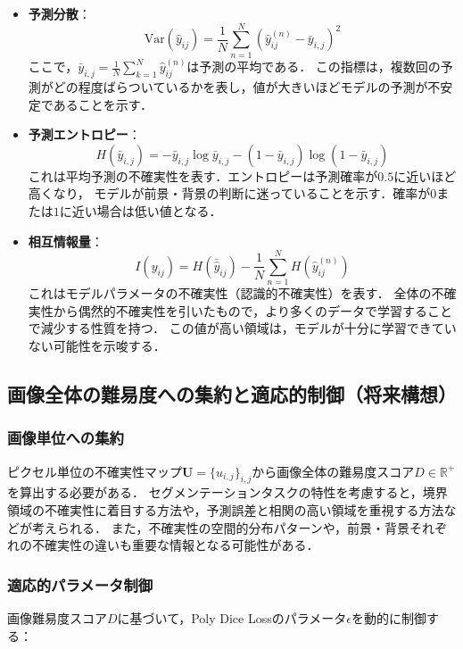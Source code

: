 \documentclass[10pt, a4paper, twocolumn]{jarticle}
\begin{document}
\begin{itemize}
  \item \textbf{予測分散}：
  \begin{equation}
    \text{Var}(\hat{y}_{ij}) = \frac{1}{N} \sum_{n=1}^{N} (\hat{y}_{ij}^{(n)} - \bar{y}_{i,j})^2
  \end{equation}
  ここで，$\bar{y}_{i,j} = \frac{1}{N} \sum_{k = 1}^{N} \hat{y}_{ij} ^ {(n)}$は予測の平均である．
  この指標は，複数回の予測がどの程度ばらついているかを表し，値が大きいほどモデルの予測が不安定であることを示す．
  \item \textbf{予測エントロピー}：
  \begin{equation}
    H(\bar{y}_{i,j}) = - \bar{y}_{i,j} \log{\bar{y}_{i,j}} - (1 - \bar{y}_{i,j}) \log{(1 - \bar{y}_{i,j})}
  \end{equation}
  これは平均予測の不確実性を表す．エントロピーは予測確率が$0.5$に近いほど高くなり，
  モデルが前景・背景の判断に迷っていることを示す．確率が$0$または$1$に近い場合は低い値となる．
  \item \textbf{相互情報量}：
  \begin{equation}
    I(y_{ij}) = H(\bar{\hat{y}}_{ij}) - \frac{1}{N}\sum_{n=1}^{N} H(\hat{y}_{ij}^{(n)})
  \end{equation}
  これはモデルパラメータの不確実性（認識的不確実性）を表す．
  全体の不確実性から偶然的不確実性を引いたもので，より多くのデータで学習することで減少する性質を持つ．
  この値が高い領域は，モデルが十分に学習できていない可能性を示唆する．
\end{itemize}

\subsection{画像全体の難易度への集約と適応的制御（将来構想）}

\subsubsection{画像単位への集約}
ピクセル単位の不確実性マップ$\mathbf{U} = \{u_{i,j}\}_{i,j}$から画像全体の難易度スコア$D \in \mathbb{R}^+$を算出する必要がある．
セグメンテーションタスクの特性を考慮すると，境界領域の不確実性に着目する方法や，予測誤差と相関の高い領域を重視する方法などが考えられる．
また，不確実性の空間的分布パターンや，前景・背景それぞれの不確実性の違いも重要な情報となる可能性がある．

\subsubsection{適応的パラメータ制御}
画像難易度スコア$D$に基づいて，Poly Dice Lossのパラメータ$\epsilon$を動的に制御する：
\end{document}
